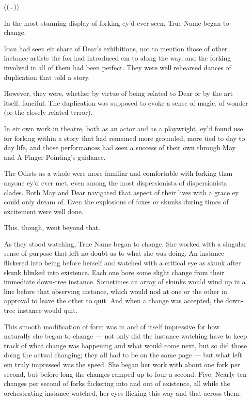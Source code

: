 ((\ldots))

In the most stunning display of forking ey'd ever seen, True Name began to change.

Ioan had seen eir share of Dear's exhibitions, not to mention those of other instance artists the fox had introduced em to along the way, and the forking involved in all of them had been perfect. They were well rehearsed dances of duplication that told a story.

However, they were, whether by virtue of being related to Dear or by the art itself, fanciful. The duplication was supposed to evoke a sense of magic, of wonder (or the closely related terror).

In eir own work in theatre, both as an actor and as a playwright, ey'd found use for forking within a story that had remained more grounded, more tied to day to day life, and those performances had seen a success of their own through May and A Finger Pointing's guidance.

The Odists as a whole were more familiar and comfortable with forking than anyone ey'd ever met, even among the most dispersionista of dispersionista clades. Both May and Dear navigated that aspect of their lives with a grace ey could only dream of. Even the explosions of foxes or skunks during times of excitement were well done.

This, though, went beyond that.

As they stood watching, True Name began to change. She worked with a singular sense of purpose that left no doubt as to what she was doing. An instance flickered into being before herself and watched with a critical eye as skunk after skunk blinked into existence. Each one bore some slight change from their immediate down-tree instance. Sometimes an array of skunks would wind up in a line before that observing instance, which would nod at one or the other in approval to leave the other to quit. And when a change was accepted, the down-tree instance would quit.

This smooth modification of form was in and of itself impressive for how naturally she began to change — not only did the instance watching have to keep track of what change was happening and what would come next, but so did those doing the actual changing; they all had to be on the same page — but what left em truly impressed was the speed. She began her work with about one fork per second, but before long the changes ramped up to four a second. Five. Nearly ten changes per second of forks flickering into and out of existence, all while the orchestrating instance watched, her eyes flicking this way and that across them.

